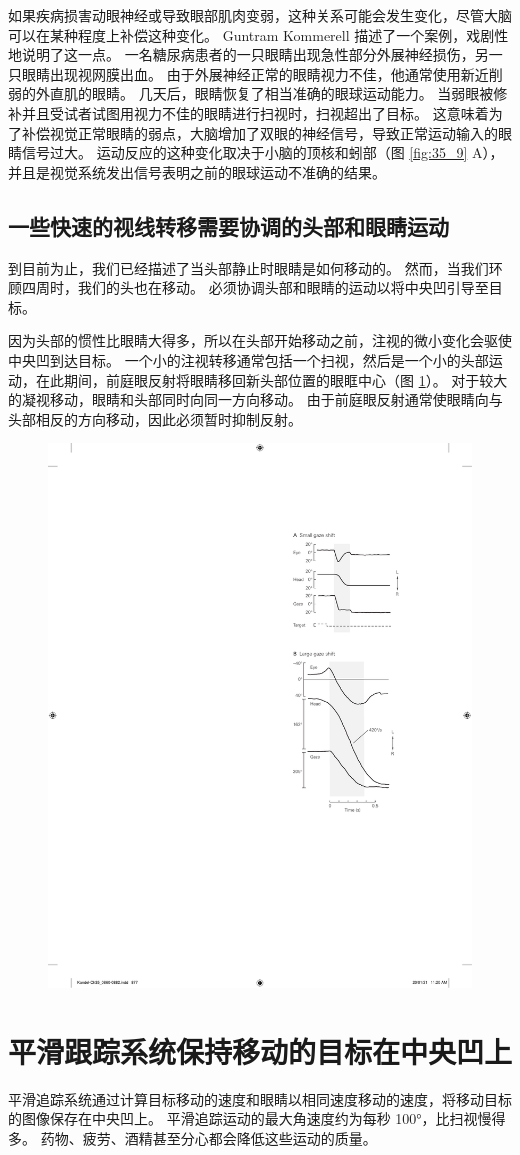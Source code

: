 如果疾病损害动眼神经或导致眼部肌肉变弱，这种关系可能会发生变化，尽管大脑可以在某种程度上补偿这种变化。 Guntram Kommerell 描述了一个案例，戏剧性地说明了这一点。 一名糖尿病患者的一只眼睛出现急性部分外展神经损伤，另一只眼睛出现视网膜出血。 由于外展神经正常的眼睛视力不佳，他通常使用新近削弱的外直肌的眼睛。 几天后，眼睛恢复了相当准确的眼球运动能力。 当弱眼被修补并且受试者试图用视力不佳的眼睛进行扫视时，扫视超出了目标。 这意味着为了补偿视觉正常眼睛的弱点，大脑增加了双眼的神经信号，导致正常运动输入的眼睛信号过大。 运动反应的这种变化取决于小脑的顶核和蚓部（图 \ref{fig:35_9} A），并且是视觉系统发出信号表明之前的眼球运动不准确的结果。

\subsection{一些快速的视线转移需要协调的头部和眼睛运动}
到目前为止，我们已经描述了当头部静止时眼睛是如何移动的。 然而，当我们环顾四周时，我们的头也在移动。 必须协调头部和眼睛的运动以将中央凹引导至目标。

因为头部的惯性比眼睛大得多，所以在头部开始移动之前，注视的微小变化会驱使中央凹到达目标。 
一个小的注视转移通常包括一个扫视，然后是一个小的头部运动，在此期间，前庭眼反射将眼睛移回新头部位置的眼眶中心（图 \ref{fig:35_14}）。 
对于较大的凝视移动，眼睛和头部同时向同一方向移动。 由于前庭眼反射通常使眼睛向与头部相反的方向移动，因此必须暂时抑制反射。

\begin{figure}[htbp]
	\centering
	\includegraphics[width=0.4\linewidth]{chap35/fig_35_14}
	\caption{}
	\label{fig:35_14}
\end{figure}


\section{平滑跟踪系统保持移动的目标在中央凹上}
平滑追踪系统通过计算目标移动的速度和眼睛以相同速度移动的速度，将移动目标的图像保存在中央凹上。 平滑追踪运动的最大角速度约为每秒 100°，比扫视慢得多。 药物、疲劳、酒精甚至分心都会降低这些运动的质量。


